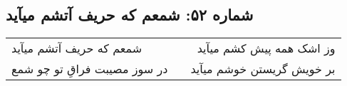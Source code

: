 \begin{center}
\section*{شماره ۵۲: شمعم که حریف آتشم میآید}
\label{sec:052}
\begin{longtable}{l p{0.5cm} r}
شمعم که حریف آتشم میآید
&&
وز اشک همه پیش کشم میآید
\\
در سوز مصیبت فراقِ تو چو شمع
&&
بر خویش گریستن خوشم میآید
\\
\end{longtable}
\end{center}
